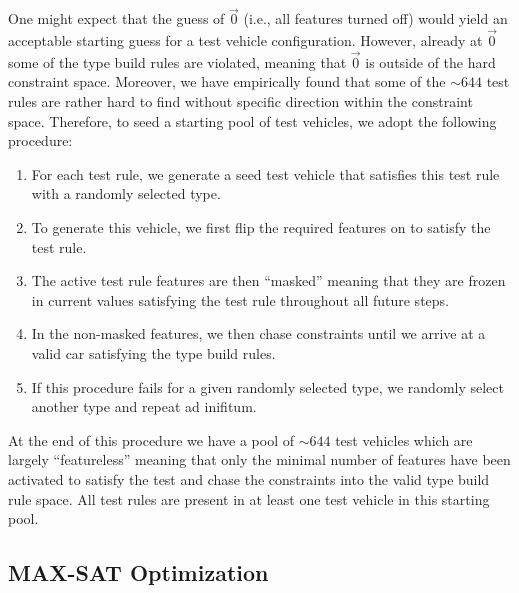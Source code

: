 \documentclass[aps,pra,twocolumn,superscriptaddress,groupedaddress]{revtex4}  %
\begin{document}
One might expect that the guess of $\vec 0$ (i.e., all features turned off)
would yield an acceptable starting guess for a test vehicle configuration.
However, already at $\vec 0$ some of the type build rules are violated, meaning
that $\vec 0$ is outside of the hard constraint space. Moreover, we have
empirically found that some of the $\sim 644$ test rules are rather hard to find
without specific direction within the constraint space. Therefore, to seed a
starting pool of test vehicles, we adopt the following procedure:
\begin{enumerate}
\item For each test rule, we generate a seed test vehicle that satisfies this
test rule with a randomly selected type.
\item To generate this vehicle, we first flip the required features on to
satisfy the test rule. 
\item The active test rule features are then ``masked'' meaning that they are
frozen in current values satisfying the test rule throughout all future steps.
\item In the non-masked features, we then chase constraints until we arrive at a
valid car satisfying the type build rules.
\item If this procedure fails for a given randomly selected type, we randomly
select another type and repeat ad inifitum.
\end{enumerate}
At the end of this procedure we have a pool of $\sim 644$ test vehicles which
are largely ``featureless'' meaning that only the minimal number of features
have been activated to satisfy the test and chase the constraints into the valid
type build rule space. All test rules are present in at least one test vehicle in this
starting pool.

\subsection{MAX-SAT Optimization}
\end{document}
